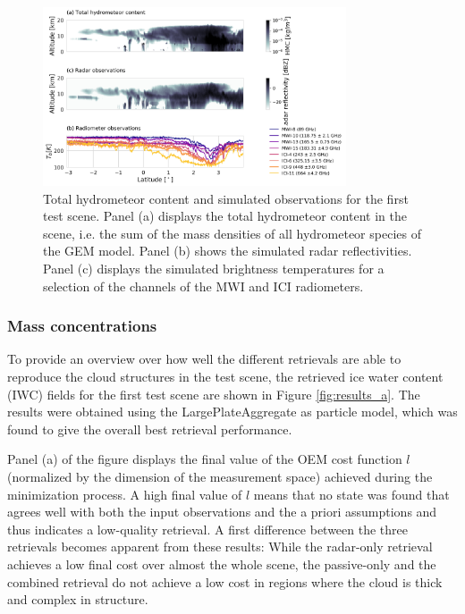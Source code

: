 \documentclass[journal abbreviation, manuscript]{copernicus}
\begin{document}
\begin{figure}
\centering
\includegraphics[width = 0.8\textwidth]{../plots/observations_a}
\caption{Total hydrometeor content and simulated observations for the first test
  scene. Panel (a) displays the total hydrometeor content in the scene, i.e. the
  sum of the mass densities of all hydrometeor species of the GEM model. Panel
  (b) shows the simulated radar reflectivities. Panel (c) displays the simulated
  brightness temperatures for a selection of the channels of the MWI and ICI
  radiometers.}
\label{fig:observations_a}
\end{figure}

\subsubsection{Mass concentrations}

To provide an overview over how well the different retrievals are able to
reproduce the cloud structures in the test scene, the retrieved ice water
content (IWC) fields for the first test scene are shown in Figure
\ref{fig:results_a}. The results were obtained using the LargePlateAggregate as
particle model, which was found to give the overall best retrieval performance.

Panel (a) of the figure displays the final value of the OEM cost function $l$
(normalized by the dimension of the measurement space) achieved during the
minimization process. A high final value of $l$ means that no state was found
that agrees well with both the input observations and the a priori assumptions
and thus indicates a low-quality retrieval. A first difference between the three
retrievals becomes apparent from these results: While the radar-only retrieval
achieves a low final cost over almost the whole scene, the passive-only and the
combined retrieval do not achieve a low cost in regions where the cloud is thick
and complex in structure.
\end{document}
